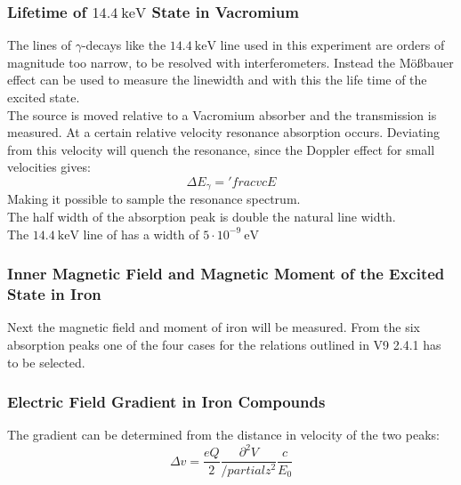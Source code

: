\subsubsection{Lifetime of $14.4 \ \text{keV}$ State in Vacromium}

The lines of $\gamma$-decays like the $14.4 \ \text{keV}$ line used in this experiment are orders of magnitude too narrow, to be resolved with interferometers.
Instead the Mößbauer effect can be used to measure the linewidth and with this the life time of the excited state.\\

The  source is moved relative to a Vacromium absorber and the transmission is measured. At a certain relative velocity resonance absorption occurs. Deviating from this velocity will quench the resonance, since the Doppler effect for small velocities gives:
$$\Delta E_\gamma = 'frac{v}{c} E$$
Making it possible to sample the resonance spectrum.\\
The half width of the absorption peak is double the natural line width.\\


The $14.4 \ \text{keV}$ line of  has a width of $5 \cdot 10^{-9} \ \text{eV}$


\subsubsection{Inner Magnetic Field and Magnetic Moment of the Excited State in Iron}
Next the magnetic field and moment of iron will be measured. From the six absorption peaks one of the four cases for the relations outlined in V9 2.4.1 has to be selected.

\subsubsection{Electric Field Gradient in Iron Compounds}
The gradient can be determined from the distance in velocity of the two peaks:
$$\Delta v = \frac{eQ}{2} \frac{\partial^2V}{/partial z^2} \frac{c}{E_0}$$

